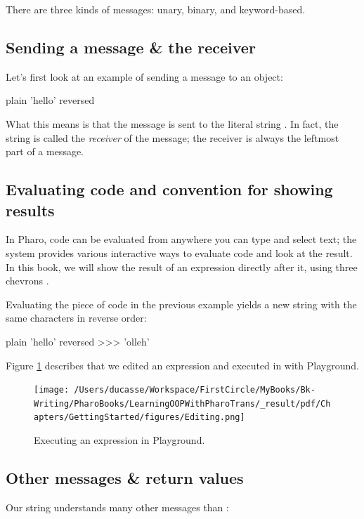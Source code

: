 \documentclass[10pt,twoside,english]{_support/latex/sbabook/sbabook}
\begin{document}
There are three kinds of messages: unary, binary, and keyword-based.
\subsection{Sending a message \& the receiver}
Let’s first look at an example of sending a message to an object:

\begin{displaycode}{plain}
'hello' reversed
\end{displaycode}

What this means is that the message  is sent to the literal string .
In fact, the string  is called the \textit{receiver} of the message; the receiver is always the leftmost part of a message.
\subsection{Evaluating code and convention for showing results}
In Pharo, code can be evaluated from anywhere you can type and select text; the system provides various interactive ways to evaluate code and look at the result.
In this book, we will show the result of an expression directly after it, using three chevrons \textcode{\textgreater{}\textgreater{}\textgreater{}}.

Evaluating the piece of code in the previous example yields a new string with the same characters in reverse order:

\begin{displaycode}{plain}
'hello' reversed
>>> 'olleh'
\end{displaycode}

Figure \ref{fig:Editing} describes that we edited an expression and executed in with Playground. 


\begin{figure}

\begin{center}
\texttt{[image: /Users/ducasse/Workspace/FirstCircle/MyBooks/Bk-Writing/PharoBooks/LearningOOPWithPharoTrans/\_result/pdf/Chapters/GettingStarted/figures/Editing.png]}\caption{Executing an expression in Playground.\label{fig:Editing}}\end{center}
\end{figure}

\subsection{Other messages \& return values}
Our  string understands many other messages than :
\end{document}
